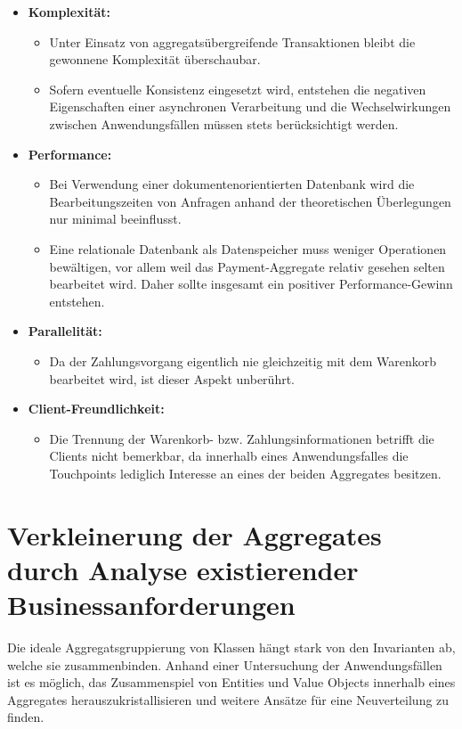 \begin{itemize}[noitemsep,nolistsep,topsep=-2pt]
	\item \textbf{Komplexität: } {
		\begin{itemize}
			\item {Unter Einsatz von aggregatsübergreifende Transaktionen bleibt die gewonnene Komplexität überschaubar.}
			\item {Sofern eventuelle Konsistenz eingesetzt wird, entstehen die negativen Eigenschaften einer asynchronen Verarbeitung und die Wechselwirkungen zwischen Anwendungsfällen müssen stets berücksichtigt werden.}
		\end{itemize}
	}
	\item \textbf{Performance: } {
		\begin{itemize}
			\item Bei Verwendung einer dokumentenorientierten Datenbank wird die Bearbeitungszeiten von Anfragen anhand der theoretischen Überlegungen nur minimal beeinflusst.
			\item Eine relationale Datenbank als Datenspeicher muss weniger Operationen bewältigen, vor allem weil das Payment-Aggregate relativ gesehen selten bearbeitet wird. Daher sollte insgesamt ein positiver Performance-Gewinn entstehen. 
		\end{itemize}
	}
	\item \textbf{Parallelität: } {
		\begin{itemize}
			\item Da der Zahlungsvorgang eigentlich nie gleichzeitig mit dem Warenkorb bearbeitet wird, ist dieser Aspekt unberührt. 
		\end{itemize}	
	}
	\item \textbf{Client-Freundlichkeit: } {
		\begin{itemize}
			\item Die Trennung der Warenkorb- bzw. Zahlungsinformationen betrifft die Clients nicht bemerkbar, da innerhalb eines Anwendungsfalles die Touchpoints lediglich Interesse an eines der beiden Aggregates besitzen.
		\end{itemize}
	}
\end{itemize}


\section{Verkleinerung der Aggregates durch Analyse existierender Businessanforderungen}

Die ideale Aggregatsgruppierung von Klassen hängt stark von den Invarianten ab, welche sie zusammenbinden. Anhand einer Untersuchung der Anwendungsfällen ist es möglich, das Zusammenspiel von Entities und Value Objects innerhalb eines Aggregates herauszukristallisieren und weitere Ansätze für eine Neuverteilung zu finden.


